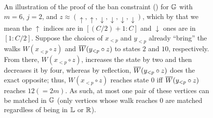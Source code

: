 \begin{figure}[t!]

\caption{An illustration of the proof of the ban constraint () for $\mathbb{G}$ with $m=6$, $j=2$, and $z \approx (\uparrow,\uparrow,\downarrow,\downarrow,\downarrow,\downarrow)$, which by that we mean the $\uparrow$ indices are in $[(C/2)+1:C]$
and $\downarrow$ ones are in $[1:C/2]$. Suppose the choices of $x_{<p}$ and $y_{<p}$ already ``bring'' the walks $W(x_{<p} \circ z)$ and $\overline{W}(y_{<p} \circ z)$ to 
states $2$ and $10$, respectively. From there, $W(x_{<p} \circ z)$, increases the state by two and then decreases it by four, whereas by reflection, $\overline{W}(y_{<p} \circ z)$ does the exact opposite; thus, 
$W(x_{<p} \circ z)$ reaches state $0$ iff $\overline{W}(y_{<p} \circ z)$ reaches $12 (=2m)$. As such, at most one pair of these vertices can be matched in $\mathbb{G}$ (only vertices whose walk reaches $0$ are matched regardless of being in $\mathbb{L}$ or $\mathbb{R}$).}
\label{fig:W}
\end{figure}
